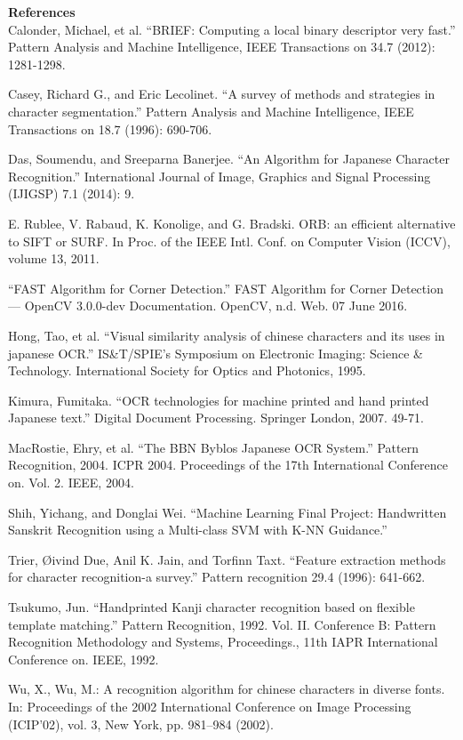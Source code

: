 \documentclass[10pt,twocolumn,letterpaper]{article}
\begin{document}
{\small

\textbf{References}\\

Calonder, Michael, et al. ``BRIEF: Computing a local binary descriptor very fast.'' Pattern Analysis and Machine Intelligence, IEEE Transactions on 34.7 (2012): 1281-1298.

Casey, Richard G., and Eric Lecolinet. ``A survey of methods and strategies in character segmentation.'' Pattern Analysis and Machine Intelligence, IEEE Transactions on 18.7 (1996): 690-706.

Das, Soumendu, and Sreeparna Banerjee. ``An Algorithm for Japanese Character Recognition.'' International Journal of Image, Graphics and Signal Processing (IJIGSP) 7.1 (2014): 9.

E. Rublee, V. Rabaud, K. Konolige, and G. Bradski. ORB: an efficient alternative to SIFT or SURF. In Proc. of the IEEE Intl. Conf. on Computer Vision (ICCV), volume 13, 2011.

``FAST Algorithm for Corner Detection.'' FAST Algorithm for Corner Detection — OpenCV 3.0.0-dev Documentation. OpenCV, n.d. Web. 07 June 2016.

Hong, Tao, et al. ``Visual similarity analysis of chinese characters and its uses in japanese OCR.'' IS\&T/SPIE's Symposium on Electronic Imaging: Science \& Technology. International Society for Optics and Photonics, 1995.

Kimura, Fumitaka. ``OCR technologies for machine printed and hand printed Japanese text.'' Digital Document Processing. Springer London, 2007. 49-71.

MacRostie, Ehry, et al. ``The BBN Byblos Japanese OCR System.'' Pattern Recognition, 2004. ICPR 2004. Proceedings of the 17th International Conference on. Vol. 2. IEEE, 2004.

Shih, Yichang, and Donglai Wei. ``Machine Learning Final Project: Handwritten Sanskrit Recognition using a Multi-class SVM with K-NN Guidance.''

Trier, Øivind Due, Anil K. Jain, and Torfinn Taxt. ``Feature extraction methods for character recognition-a survey.'' Pattern recognition 29.4 (1996): 641-662.

Tsukumo, Jun. ``Handprinted Kanji character recognition based on flexible template matching.'' Pattern Recognition, 1992. Vol. II. Conference B: Pattern Recognition Methodology and Systems, Proceedings., 11th IAPR International Conference on. IEEE, 1992.

Wu, X., Wu, M.: A recognition algorithm for chinese characters in diverse fonts. In: Proceedings of the 2002 International Conference on Image Processing (ICIP’02), vol. 3, New York, pp. 981–984 (2002).
}
\end{document}

